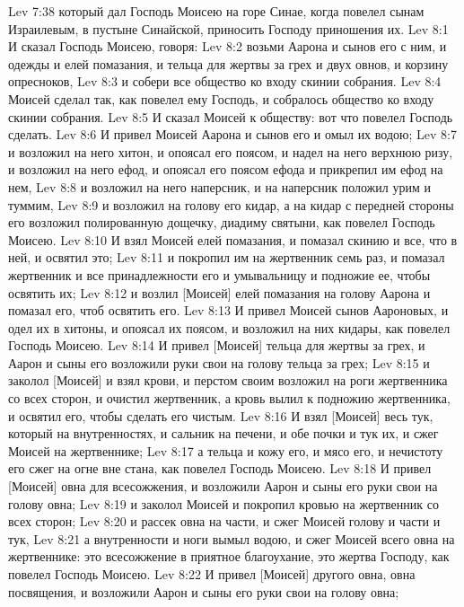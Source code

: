 \vs Lev 7:38 который дал Господь Моисею на горе Синае, когда повелел сынам Израилевым, в пустыне Синайской, приносить Господу приношения их.
\vs Lev 8:1 И сказал Господь Моисею, говоря:
\vs Lev 8:2 возьми Аарона и сынов его с ним, и одежды и елей помазания, и тельца для жертвы за грех и двух овнов, и корзину опресноков,
\vs Lev 8:3 и собери все общество ко входу скинии собрания.
\rsbpar\vs Lev 8:4 Моисей сделал так, как повелел ему Господь, и собралось общество ко входу скинии собрания.
\vs Lev 8:5 И сказал Моисей к обществу: вот что повелел Господь сделать.
\vs Lev 8:6 И привел Моисей Аарона и сынов его и омыл их водою;
\vs Lev 8:7 и возложил на него хитон, и опоясал его поясом, и надел на него верхнюю ризу, и возложил на него ефод, и опоясал его поясом ефода и прикрепил им ефод на нем,
\vs Lev 8:8 и возложил на него наперсник, и на наперсник положил урим и туммим,
\vs Lev 8:9 и возложил на голову его кидар, а на кидар с передней стороны его возложил полированную дощечку, диадиму святыни, как повелел Господь Моисею.
\vs Lev 8:10 И взял Моисей елей помазания, и помазал скинию и все, что в ней, и освятил это;
\vs Lev 8:11 и покропил им на жертвенник семь раз, и помазал жертвенник и все принадлежности его и умывальницу и подножие ее, чтобы освятить их;
\vs Lev 8:12 и возлил [Моисей] елей помазания на голову Аарона и помазал его, чтоб освятить его.
\vs Lev 8:13 И привел Моисей сынов Аароновых, и одел их в хитоны, и опоясал их поясом, и возложил на них кидары, как повелел Господь Моисею.
\rsbpar\vs Lev 8:14 И привел [Моисей] тельца для жертвы за грех, и Аарон и сыны его возложили руки свои на голову тельца за грех;
\vs Lev 8:15 и заколол  [Моисей] и взял крови, и перстом своим возложил на роги жертвенника со всех сторон, и очистил жертвенник, а  кровь вылил к подножию жертвенника, и освятил его, чтобы сделать его чистым.
\vs Lev 8:16 И взял [Моисей] весь тук, который на внутренностях, и сальник на печени, и обе почки и тук их, и сжег Моисей на жертвеннике;
\vs Lev 8:17 а тельца и кожу его, и мясо его, и нечистоту его сжег на огне вне стана, как повелел Господь Моисею.
\vs Lev 8:18 И привел [Моисей] овна для всесожжения, и возложили Аарон и сыны его руки свои на голову овна;
\vs Lev 8:19 и заколол  Моисей и покропил кровью на жертвенник со всех сторон;
\vs Lev 8:20 и рассек овна на части, и сжег Моисей голову и части и тук,
\vs Lev 8:21 а внутренности и ноги вымыл водою, и сжег Моисей всего овна на жертвеннике: это всесожжение в приятное благоухание, это жертва Господу, как повелел Господь Моисею.
\vs Lev 8:22 И привел [Моисей] другого овна, овна посвящения, и возложили Аарон и сыны его руки свои на голову овна;
